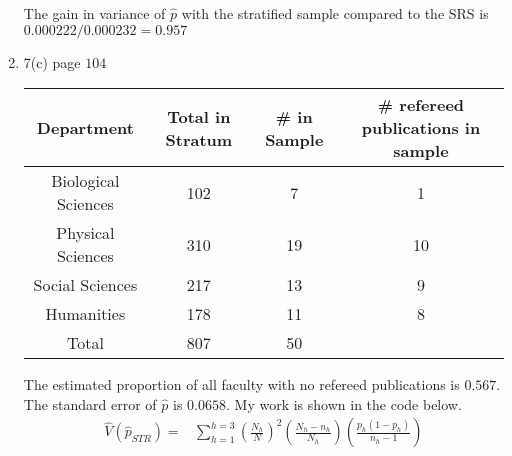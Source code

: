 \documentclass[12pt]{article}\usepackage[]{graphicx}\usepackage[]{color}
\begin{document}
\begin{doublespacing}
\begin{enumerate}
The gain in variance of $\hat{p}$ with the stratified sample compared to the SRS is $0.000222/0.000232=0.957$



\item 7(c) page $104$

\begin{table}[H]
\centering
\begin{tabular}{c|c|c|c}
Department & Total in Stratum & \# in Sample & \# refereed publications in sample \\
\hline
Biological Sciences & 102 & 7 & 1 \\
Physical Sciences & 310 & 19 & 10 \\
Social Sciences & 217 & 13 & 9 \\
Humanities & 178 & 11 & 8 \\
\hline
Total & 807 & 50 & \\
\hline
\end{tabular}
\end{table}

The estimated proportion of all faculty with no refereed publications is $0.567$. The standard error of $\hat{p}$ is $0.0658$. My work is shown in the code below.
\begin{align*}
\hat{V}(\hat{p}_{STR}) = &\sum_{h=1}^{h=3} \left(\frac{N_h}{N}\right)^2 \left(\frac{N_h-n_h}{N_h}\right) \left(\frac{p_h(1-p_h)}{n_h-1}\right)
\end{align*}


\end{enumerate}
\end{doublespacing}
\end{document}
